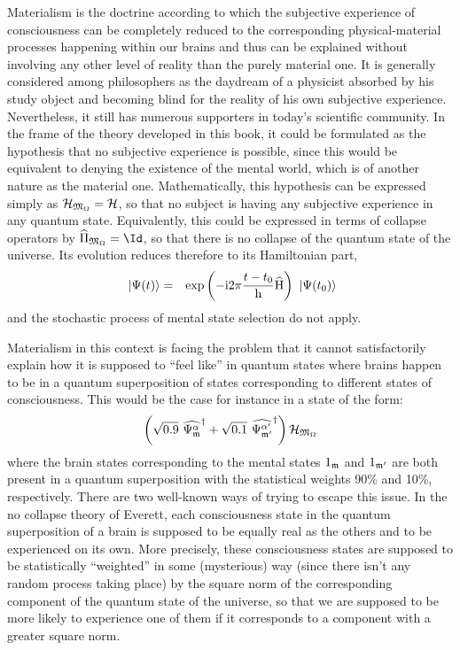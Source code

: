Materialism is the doctrine according to which the subjective experience of consciousness can be completely reduced to the corresponding physical-material processes happening within our brains and thus can be explained without involving any other level of reality than the purely material one. It is generally considered among philosophers as the daydream of a physicist absorbed by his study object and becoming blind for the reality of his own subjective experience. Nevertheless, it still has numerous supporters in today's scientific community. In the frame of the theory developed in this book, it could be formulated as the hypothesis that no subjective experience is possible, since this would be equivalent to denying the existence of the mental world, which is of another nature as the material one. Mathematically, this hypothesis can be expressed simply as $\mathcal H_{\mathfrak{M}_\Omega} = \mathcal H$, so that no subject is having any subjective experience in any quantum state. Equivalently, this could be expressed in terms of collapse operators by $\op{\Pi}_{\cms_\vac} = \Id$, so that there is no collapse of the quantum state of the universe. Its evolution reduces therefore to its Hamiltonian part,
\begin{eqnarray*}
\ \left|{\Psi(t)}\right\rangle & = & \mathrm{exp} \left( {- \mathrm{i} 2 \pi \frac{t - t_0} {\mathrm h} \widehat{\mathrm H}} \right) \ \left|{\Psi(t_0)}\right\rangle
\end{eqnarray*}
and the stochastic process of mental state selection do not apply.

Materialism in this context is facing the problem that it cannot satisfactorily explain how it is supposed to ``feel like'' in quantum states where brains happen to be in a quantum superposition of states corresponding to different states of consciousness. This would be the case for instance in a state of the form:
\begin{equation*}
\left(\sqrt{0.9}\ \widehat{\Psi_{\mathfrak{m}}^\alpha}^{\dagger} + \sqrt{0.1}\ \widehat{\Psi_{\mathfrak{m}'}^{\alpha'}}^{\dagger}\right) \mathcal H_{\mathfrak{M}_\Omega}
\end{equation*}
where the brain states corresponding to the mental states ${1}_{\mathfrak{m}}$ and ${1}_{\mathfrak{m}'}$ are both present in a quantum superposition with the statistical weights 90\% and 10\%, respectively. There are two well-known ways of trying to escape this issue. In the no collapse theory of Everett, each consciousness state in the quantum superposition of a brain is supposed to be equally real as the others and to be experienced on its own. More precisely, these consciousness states are supposed to be statistically ``weighted'' in some (mysterious) way (since there isn't any random process taking place) by the square norm of the corresponding component of the quantum state of the universe, so that we are supposed to be more likely to experience one of them if it corresponds to a component with a greater square norm.

